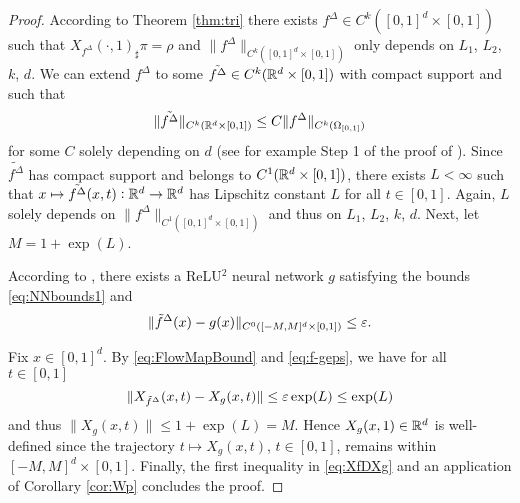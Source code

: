 \begin{proof}
  According to Theorem \ref{thm:tri} there exists
  ${f^\Delta}\in C^k([0,1]^d\times [0,1])$ such that
  $X_{f^\Delta}(\cdot,1)_\sharp\pi=\rho$ and $\|{f^\Delta}\|_{C^k([0,1]^d\times [0,1])}$
  only depends on $L_1$, $L_2$, $k$, $d$. We can extend ${f^\Delta}$ to some
  $\tilde {f^\Delta}\in C^k(\mathbb{R}^d\times [0,1])$ with compact support and such
  that
  \begin{equation*}
    \|\tilde {f^\Delta}\|_{C^k(\mathbb{R}^d\times [0,1])}\le C \|{f^\Delta}\|_{C^k(\Omega_{[0,1]})}
  \end{equation*}
  for some $C$ solely depending on $d$ (see for example Step 1 of the
  proof of \cite[Theorem 33]{StatisticalNODE}). Since $\tilde {f^\Delta}$ has compact
  support and belongs to $C^1(\mathbb{R}^d\times [0,1])$, there exists $L<\infty$ such that
  $x\mapsto \tilde {f^\Delta}(x,t):\mathbb{R}^d\to\mathbb{R}^d$ has Lipschitz constant $L$ for all
  $t\in [0,1]$. Again, $L$ solely depends on
  $\|{f^\Delta}\|_{C^1([0,1]^d\times [0,1])}$ and thus on $L_1$, $L_2$, $k$,
  $d$. Next, let $M=1+\exp(L)$. %

  According to
  \citet[Theorem 16]{StatisticalNODE}, there exists a ReLU$^2$ neural
  network $g$ satisfying the bounds \eqref{eq:NNbounds1} and
  \begin{equation}\label{eq:f-geps}
\|{\tilde f^\Delta}(x)-g(x)\|_{C^0([-M,M]^d\times [0,1])}\le\varepsilon.
  \end{equation}


  Fix $x\in [0,1]^d$. By \eqref{eq:FlowMapBound}
  and \eqref{eq:f-geps}, we
  have for all $t\in [0,1]$
    \begin{equation}\label{eq:XfDXg}
      \|X_{\tilde f^\Delta}(x,t)-X_g(x,t)\|\le \varepsilon\exp(L)\le\exp(L)
    \end{equation}
    and thus $\|X_{g}(x,t)\|\le 1+\exp(L)=M$.
  Hence $X_g(x,1)\in\mathbb{R}^d$ is well-defined since the trajectory
  $t\mapsto X_g(x,t)$, $t\in[0,1]$, remains within
  $[-M,M]^d\times [0,1]$. %
  Finally, the first inequality in \eqref{eq:XfDXg} and an application of
  Corollary \ref{cor:Wp} concludes the proof.
\end{proof}





